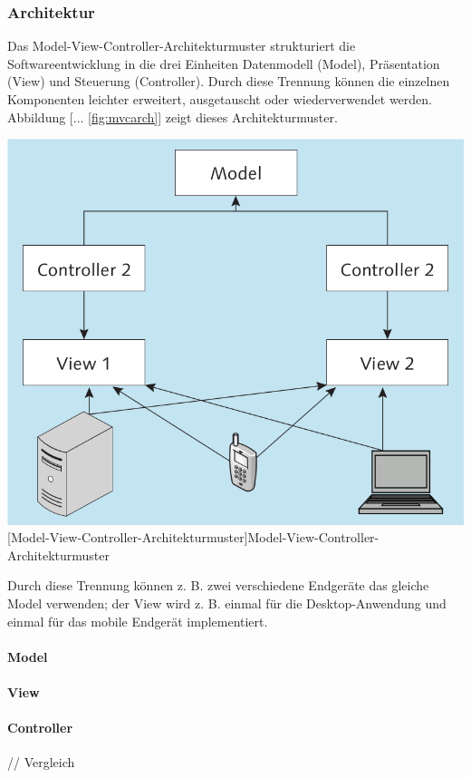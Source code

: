 \documentclass[12pt,a4paper,bibliography=totocnumbered,listof=totocnumbered]{scrartcl}
\begin{document}
\subsubsection{Architektur}
\glqq Das Model-View-Controller-Architekturmuster strukturiert die Softwareentwicklung in die drei Einheiten Datenmodell (Model), Präsentation (View) und Steuerung (Controller). Durch diese Trennung können die einzelnen Komponenten leichter erweitert, ausgetauscht oder wiederverwendet werden. Abbildung [... \ref{fig:mvcarch}] zeigt dieses Architekturmuster.

	\vspace{1em}
	\begin{minipage}{\linewidth}
		\centering
		\includegraphics[width=0.7\linewidth]{images/mvc_arch.png}
		[Model-View-Controller-Architekturmuster]{Model-View-Controller-Architekturmuster\cite[S.123]{AntoEinf2014}}
		\label{fig:mvcarch}
	\end{minipage}

Durch diese Trennung können z. B. zwei verschiedene Endgeräte das gleiche Model verwenden; der View wird z. B. einmal für die Desktop-Anwendung und einmal für das mobile Endgerät implementiert.\grqq{}\cite[S.123]{AntoEinf2014}

\paragraph{Model}

\paragraph{View}

\paragraph{Controller}
// Vergleich\\
\end{document}
